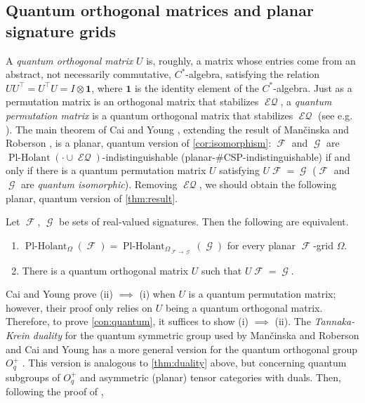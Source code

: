 \documentclass{article}
\DeclareMathOperator{\fc}{\mathcal{F}}
\DeclareMathOperator{\gc}{\mathcal{G}}
\DeclareMathOperator{\plholant}{Pl-Holant}
\DeclareMathOperator{\eq}{\mathcal{EQ}}
\begin{document}
\subsection{Quantum orthogonal matrices and planar signature grids}
A \emph{quantum orthogonal matrix} $U$ is, roughly, a matrix whose entries come from an abstract,
not necessarily commutative,
$C^*$-algebra, satisfying the relation $UU^\top = U^\top U = I \otimes \mathbf{1}$, where $\mathbf{1}$
is the identity element of the $C^*$-algebra.
Just as a permutation matrix is an orthogonal matrix that stabilizes $\eq$, 
a \emph{quantum permutation matrix} is a quantum orthogonal matrix that
stabilizes $\eq$ (see e.g. \cite[Equation 27]{cai_planar_2023}). The main theorem of Cai and Young
\cite{cai_planar_2023}, extending the result of Man\v{c}inska and Roberson \cite{planar}, is a planar,
quantum version of \autoref{cor:isomorphism}:
$\fc$ and $\gc$ are $\plholant(\cdot \cup \eq)$-indistinguishable 
(planar-\#CSP-indistinguishable) if and only if there is a quantum permutation matrix $U$ satisfying
$U \fc = \gc$ ($\fc$ and $\gc$ are \emph{quantum isomorphic}). 
Removing $\eq$, we should obtain the following planar, quantum version of \autoref{thm:result}.
\begin{conjecture}
    \label{con:quantum}
    Let $\fc$, $\gc$ be sets of real-valued signatures. Then the following are equivalent.
    \begin{enumerate}[label=(\roman*)]
        \item $\plholant_{\Omega}(\fc) = \plholant_{\Omega_{\fc\to\gc}}(\gc)$
        for every planar $\fc$-grid $\Omega$.
        \item There is a quantum orthogonal matrix $U$ such that $U\fc = \gc$.
    \end{enumerate}
\end{conjecture}
Cai and Young \cite[Theorem 5]{cai_planar_2023} prove (ii) $\implies$ (i) when $U$ is a quantum permutation matrix;
however, their proof only relies on $U$ being a quantum orthogonal matrix. Therefore,
to prove \autoref{con:quantum}, it suffices to show (i) $\implies$ (ii). The \emph{Tannaka-Krein duality}
for the quantum symmetric group used by Man\v{c}inska and Roberson and Cai and Young 
\cite[Theorem 3]{cai_planar_2023} has a more general version
for the quantum orthogonal group $O_q^+$ \cite[Theorem 2.13]{planar}. This version is
analogous to \autoref{thm:duality} above, but concerning quantum subgroups of $O_q^+$ and asymmetric
(planar) tensor categories with duals. Then, following the proof of \cite[Theorem 4]{cai_planar_2023},
\end{document}
